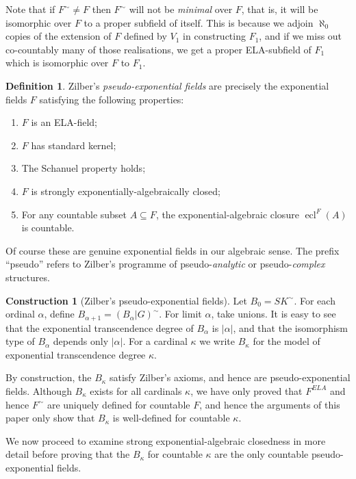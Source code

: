 \documentclass[12pt]{amsart}
\theoremstyle{definition}
\newtheorem{defn}[prop]{Definition}
\newtheorem{construction}[prop]{Construction}
\begin{document}
Note that if ${\ensuremath{{{F}}^\sim}} \neq F$ then ${\ensuremath{{{F}}^\sim}}$ will not be \emph{minimal} over $F$, that is, it will be isomorphic over $F$ to a proper subfield of itself. This is because we adjoin $\aleph_0$ copies of the extension of $F$ defined by $V_1$ in constructing $F_1$, and if we miss out co-countably many of those realisations, we get a proper ELA-subfield of $F_1$ which is isomorphic over $F$ to $F_1$.

\begin{defn}
  Zilber's \emph{pseudo-exponential fields} are precisely the exponential fields $F$ satisfying the following properties:
 \begin{enumerate}
 \item $F$ is an ELA-field;
 \item $F$ has standard kernel;
 \item The Schanuel property holds; 
 \item $F$ is {strongly exponentially-algebraically closed};
 \item For any countable subset $A {\subseteq} F$, the exponential-algebraic closure $\operatorname{ecl}^F(A)$ is countable. 
\end{enumerate}
\end{defn}
Of course these are genuine exponential fields in our algebraic sense. The prefix ``pseudo'' refers to Zilber's programme of pseudo-\emph{analytic} or pseudo-\emph{complex} structures. 

\begin{construction}[Zilber's pseudo-exponential fields]\label{pseudoexp}
Let $B_0 = {\ensuremath{{{SK}}^\sim}}$. For each ordinal $\alpha$, define $B_{\alpha+1} = {\ensuremath{{{(B_\alpha|G)}}^\sim}}$. For limit $\alpha$, take unions. It is easy to see that the exponential transcendence degree of $B_\alpha$ is $|\alpha|$, and that the isomorphism type of
$B_\alpha$ depends only $|\alpha|$. For a cardinal $\kappa$ we write $B_\kappa$ for the model of exponential transcendence degree $\kappa$.  
\end{construction}

By construction, the $B_\kappa$ satisfy Zilber's axioms, and hence are pseudo-exponential fields. Although $B_\kappa$ exists for all cardinals $\kappa$, we have only proved that $F^{ELA}$ and hence ${\ensuremath{{{F}}^\sim}}$ are  uniquely defined for countable $F$, and hence the arguments of this paper only show that $B_\kappa$ is well-defined for countable $\kappa$.

We now proceed to examine strong exponential-algebraic closedness in more detail before proving that the $B_\kappa$ for countable $\kappa$ are the only countable pseudo-exponential fields.
\end{document}
